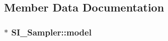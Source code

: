 \subsection{Member Data Documentation}
\hypertarget{class_s_i___sampler_b79ecd357866d7ed5ab1867c4a5633e7}{
\subsubsection[{model}]{$\ast$ {\bf SI\_\-Sampler::model}}}
\label{class_s_i___sampler_b79ecd357866d7ed5ab1867c4a5633e7}


